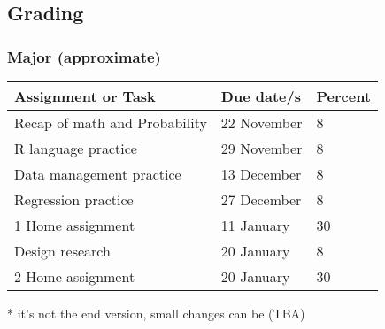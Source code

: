 \documentclass[t, 11pt]{beamer}
\begin{document}
	
	\subsection{Grading}
	
	\begin{frame}\label{}
		\frametitle{\insertsection}
		\frametitle{Major  (approximate)}
		\begin{table}[]
			\begin{threeparttable}
				\begin{tabular}{@{}lll@{}}
					\toprule
					\textbf{Assignment or Task}   & \textbf{Due date/s} & \textbf{Percent} \\ \midrule
					Recap of math and Probability & 22 November         & 8       \\
					R language practice           & 29 November         & 8      \\
					Data management practice      & 13 December         & 8                \\
					Regression practice           & 27 December         & 8                \\
					1 Home assignment             & 11 January          & 30               \\
					Design research               & 20 January          & 8                \\
					2 Home assignment             & 20 January          & 30               \\ \bottomrule
				\end{tabular}
				\begin{tablenotes}\footnotesize
					\item[*]  it's not the end version, small changes can be (TBA)
				\end{tablenotes}
			\end{threeparttable}
		\end{table}
	\end{frame}
	
\end{document}
